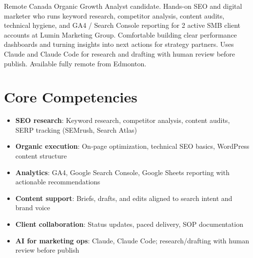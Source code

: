 \documentclass[11pt,a4paper,sans]{moderncv}
\begin{document}
\makecvtitle

\vspace{6pt}
\small{Remote Canada Organic Growth Analyst candidate. Hands-on SEO and digital marketer who runs keyword research, competitor analysis, content audits, technical hygiene, and GA4 / Search Console reporting for 2 active SMB client accounts at Lumin Marketing Group. Comfortable building clear performance dashboards and turning insights into next actions for strategy partners. Uses Claude and Claude Code for research and drafting with human review before publish. Available fully remote from Edmonton.}

\section{Core Competencies}
\vspace{1pt}
\begin{itemize}
\item \textbf{SEO research}: Keyword research, competitor analysis, content audits, SERP tracking (SEMrush, Search Atlas)
\item \textbf{Organic execution}: On-page optimization, technical SEO basics, WordPress content structure
\item \textbf{Analytics}: GA4, Google Search Console, Google Sheets reporting with actionable recommendations
\item \textbf{Content support}: Briefs, drafts, and edits aligned to search intent and brand voice
\item \textbf{Client collaboration}: Status updates, paced delivery, SOP documentation
\item \textbf{AI for marketing ops}: Claude, Claude Code; research/drafting with human review before publish
\end{itemize}
\end{document}
